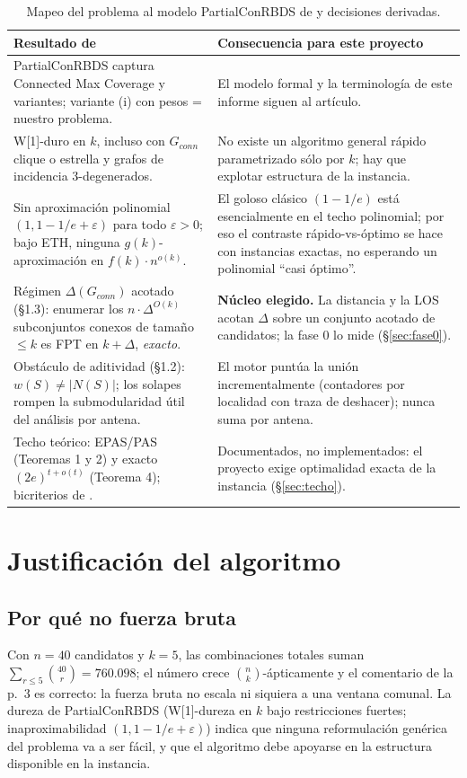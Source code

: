 \documentclass[12pt,letterpaper]{article}
\begin{document}
\begin{table}[H]
\centering\small
\begin{tabular}{p{6.2cm}p{8.4cm}}
\toprule
\textbf{Resultado de \cite{itcs2026}} & \textbf{Consecuencia para este proyecto} \\
\midrule
PartialConRBDS captura Connected Max Coverage \cite{hochbaum2020} y variantes; variante (i) con pesos = nuestro problema. & El modelo formal y la terminología de este informe siguen al artículo. \\
W[1]-duro en $k$, incluso con $G_{conn}$ clique o estrella y grafos de incidencia 3-degenerados. & No existe un algoritmo general rápido parametrizado sólo por $k$; hay que explotar estructura de la instancia. \\
Sin aproximación polinomial $(1, 1-1/e+\varepsilon)$ para todo $\varepsilon > 0$; bajo ETH, ninguna $g(k)$-aproximación en $f(k) \cdot n^{o(k)}$. & El goloso clásico $(1-1/e)$ está esencialmente en el techo polinomial; por eso el contraste rápido-vs-óptimo se hace con instancias exactas, no esperando un polinomial ``casi óptimo''. \\
Régimen $\Delta(G_{conn})$ acotado (§1.3): enumerar los $n \cdot \Delta^{O(k)}$ subconjuntos conexos de tamaño $\le k$ es FPT en $k+\Delta$, \emph{exacto}. & \textbf{Núcleo elegido.} La distancia y la LOS acotan $\Delta$ sobre un conjunto acotado de candidatos; la fase 0 lo mide (§\ref{sec:fase0}). \\
Obstáculo de aditividad (§1.2): $w(S) \neq |N(S)|$; los solapes rompen la submodularidad útil del análisis por antena. & El motor puntúa la unión incrementalmente (contadores por localidad con traza de deshacer); nunca suma por antena. \\
Techo teórico: EPAS/PAS (Teoremas 1 y 2) y exacto $(2e)^{t+o(t)}$ (Teorema 4); bicriterios de \cite{dangelo2025}. & Documentados, no implementados: el proyecto exige optimalidad exacta de la instancia (§\ref{sec:techo}). \\
\bottomrule
\end{tabular}
\caption{Mapeo del problema al modelo PartialConRBDS de \cite{itcs2026} y decisiones derivadas.}
\label{tab:mapeo}
\end{table}

\section{Justificación del algoritmo}
\label{sec:teoria}

\subsection{Por qué no fuerza bruta}
Con $n = 40$ candidatos y $k = 5$, las combinaciones totales suman $\sum_{r \le 5}\binom{40}{r} = 760.098$; el número crece $\binom{n}{k}$-ápticamente y el comentario de la p.~3 es correcto: la fuerza bruta no escala ni siquiera a una ventana comunal. La dureza de PartialConRBDS (W[1]-dureza en $k$ bajo restricciones fuertes; inaproximabilidad $(1, 1-1/e+\varepsilon)$) indica que ninguna reformulación genérica del problema va a ser fácil, y que el algoritmo debe apoyarse en la estructura disponible en la instancia.
\end{document}
